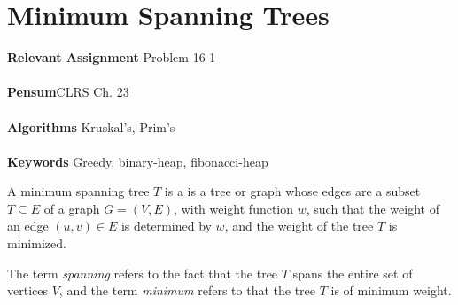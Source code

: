 
\chapter{Minimum Spanning Trees}
\label{ch:minimumspanningtrees}

\textbf{Relevant Assignment} Problem 16-1\\\\
\textbf{Pensum}CLRS Ch. 23\\\\
\textbf{Algorithms} Kruskal's, Prim's\\\\
\textbf{Keywords} Greedy, binary-heap, fibonacci-heap
\vspace{1in}

\noindent A minimum spanning tree $T$ is a is a tree or graph whose edges are
a subset $T \subseteq E$ of a graph $G = (V, E)$, with weight function $w$,
such that the weight of an edge $(u, v) \in E$ is determined by $w$, and the
weight of the tree $T$ is minimized.

The term \textit{spanning} refers to the fact that the tree $T$ spans the
entire set of vertices $V$, and the term \textit{minimum} refers to that the
tree $T$ is of minimum weight.

